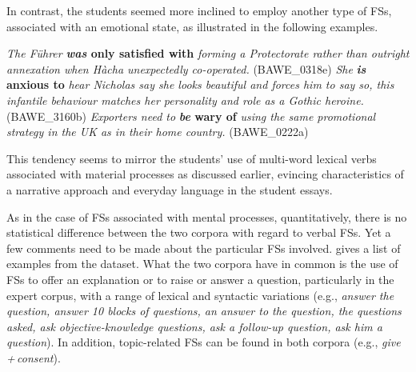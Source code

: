 \documentclass[output=paper]{langscibook}
\begin{document}
In contrast, the students seemed more inclined to employ another type of FSs, associated with an emotional state, as illustrated in the following examples. 

\ea \textit{The Führer} \textbf{\textit{was} \textbf{only} \textbf{satisfied} \textbf{with}} \textit{forming a Protectorate rather than outright annexation when Hàcha unexpectedly co-operated.} (BAWE\_0318e)
\ex \textit{She} \textbf{\textit{is} \textbf{anxious} \textbf{to}} \textit{hear Nicholas say she looks beautiful and forces him to say so, this infantile behaviour matches her personality and role as a Gothic heroine.} (BAWE\_3160b)
\ex \textit{Exporters need to} \textbf{\textit{be} \textbf{wary} \textbf{of}} \textit{using the same promotional strategy in the UK as in their home country.} (BAWE\_0222a)
\z

This tendency seems to mirror the students’ use of multi-word lexical verbs associated with material processes as discussed earlier, evincing characteristics of a narrative approach and everyday language in the student essays.

As in the case of FSs associated with mental processes, quantitatively, there is no statistical difference between the two corpora with regard to verbal FSs. Yet a few comments need to be made about the particular FSs involved.  gives a list of examples from the dataset. What the two corpora have in common is the use of FSs to offer an explanation or to raise or answer a question, particularly in the expert corpus, with a range of lexical and syntactic variations (e.g., \textit{answer the question, answer 10 blocks of questions, an answer to the question, the questions asked, ask objective-knowledge questions, ask a follow-up question, ask him a question}). In addition, topic-related FSs can be found in both corpora (e.g., \textit{give\,+\,consent}). 
\end{document}
